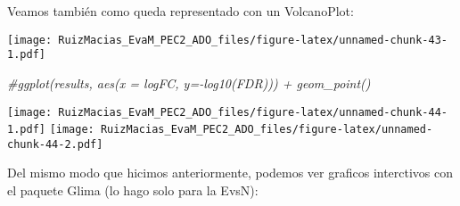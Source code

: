 \documentclass[
]{article}
\newenvironment{Shaded}{\begin{snugshade}}{\end{snugshade}}
\newcommand{\CommentTok}[1]{\textcolor[rgb]{0.56,0.35,0.01}{\textit{#1}}}
\newcommand{\DataTypeTok}[1]{\textcolor[rgb]{0.13,0.29,0.53}{#1}}
\newcommand{\DecValTok}[1]{\textcolor[rgb]{0.00,0.00,0.81}{#1}}
\newcommand{\KeywordTok}[1]{\textcolor[rgb]{0.13,0.29,0.53}{\textbf{#1}}}
\newcommand{\NormalTok}[1]{#1}
\newcommand{\OperatorTok}[1]{\textcolor[rgb]{0.81,0.36,0.00}{\textbf{#1}}}
\newcommand{\StringTok}[1]{\textcolor[rgb]{0.31,0.60,0.02}{#1}}
\begin{document}
Veamos también como queda representado con un VolcanoPlot:

\begin{Shaded}
\end{Shaded}

\texttt{[image: RuizMacias\_EvaM\_PEC2\_ADO\_files/figure-latex/unnamed-chunk-43-1.pdf]}

\begin{Shaded}
\begin{Highlighting}[]
\CommentTok{#ggplot(results, aes(x = logFC, y=-log10(FDR))) + geom_point()}
\end{Highlighting}
\end{Shaded}

\texttt{[image: RuizMacias\_EvaM\_PEC2\_ADO\_files/figure-latex/unnamed-chunk-44-1.pdf]}
\texttt{[image: RuizMacias\_EvaM\_PEC2\_ADO\_files/figure-latex/unnamed-chunk-44-2.pdf]}

Del mismo modo que hicimos anteriormente, podemos ver graficos
interctivos con el paquete Glima (lo hago solo para la EvsN):

\begin{Shaded}
\end{Shaded}
\end{document}
